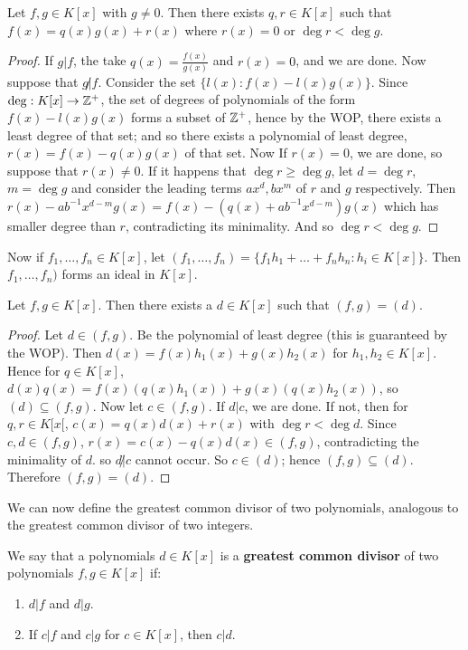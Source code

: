 \begin{lemma}\label{lemma1.2.1}
    Let $f,g \in K[x]$ with $g \neq 0$. Then there exists $q,r \in K[x]$ such that $f(x)=q(x)g(x)+r(x)$ where $r(x)=0$ or $\deg{r}<\deg{g}$. 
\end{lemma}
\begin{proof}
    If $g|f$, the take $q(x)=\frac{f(x)}{g(x)}$ and $r(x)=0$, and we are done. Now suppose that $g \not| f$. Consider the set $\{l(x):f(x)-l(x)g(x)\}$. Since $\deg:K[x] \rightarrow \mathbb{Z}^+$, the set of degrees of polynomials of the form $f(x)-l(x)g(x)$ forms a subset of $\mathbb{Z}^+$, hence by the WOP, there exists a least degree of that set; and so there exists a polynomial of least degree, $r(x)=f(x)-q(x)g(x)$ of that set. Now If $r(x)=0$, we are done, so suppose that $r(x) \neq 0$. If it happens that $\deg{r} \geq \deg{g}$, let $d=\deg{r}$, $m=\deg{g}$ and consider the leading terms $ax^d,bx^m$ of $r$ and $g$ respectively. Then $r(x)-ab^{-1}x^{d-m}g(x)=f(x)-(q(x)+ab^{-1}x^{d-m})g(x)$ which has smaller degree than $r$, contradicting its minimality. And so $\deg{r}<\deg{g}$. 
\end{proof}

Now if $f_1, \dots, f_n \in K[x]$, let $(f_1, \dots, f_n)=\{f_1h_1+\dots+f_nh_n:h_i \in K[x]\}$. Then $f_1, \dots, f_n)$ forms an ideal in $K[x]$. 

\begin{lemma}\label{lemma1.2.2}
    Let $f,g \in K[x]$. Then there exists a $d \in K[x]$ such that $(f,g)=(d)$. 
\end{lemma}
\begin{proof}
    Let $d \in (f,g)$. Be the polynomial of least degree (this is guaranteed by the WOP). Then $d(x)=f(x)h_1(x)+g(x)h_2(x)$ for $h_1,h_2 \in K[x]$. Hence for $q \in K[x]$, $d(x)q(x)=f(x)(q(x)h_1(x))+g(x)(q(x)h_2(x))$, so $(d) \subseteq (f,g)$. Now let $c \in (f,g)$. If $d|c$, we are done. If not, then for $q,r \in K[x[$, $c(x)=q(x)d(x)+r(x)$ with $\deg{r}<\deg{d}$. Since $c,d \in (f,g)$, $r(x)=c(x)-q(x)d(x) \in (f,g)$, contradicting the minimality of $d$. so $d \not| c$ cannot occur. So $c \in (d)$; hence $(f,g) \subseteq (d)$. Therefore $(f,g)=(d)$. 
\end{proof}

We can now define the greatest common divisor of two polynomials, analogous to the greatest common divisor of two integers.

\begin{definition}
    We say that a polynomials $d \in K[x]$ is a \textbf{greatest common divisor} of two polynomials $f,g \in K[x]$ if:
        \begin{enumerate}[label=(\arabic*)]
            \item $d|f$ and $d|g$.
            
            \item If $c|f$ and $c|g$ for $c \in K[x]$, then $c|d$.
        \end{enumerate}
\end{definition}

